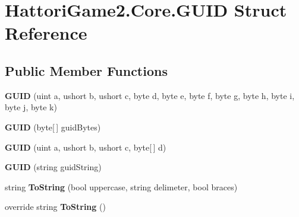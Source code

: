 \hypertarget{struct_hattori_game2_1_1_core_1_1_g_u_i_d}{}\section{Hattori\+Game2.\+Core.\+G\+U\+I\+D Struct Reference}
\label{struct_hattori_game2_1_1_core_1_1_g_u_i_d}
\subsection*{Public Member Functions}
\begin{DoxyCompactItemize}
\item 
\hypertarget{struct_hattori_game2_1_1_core_1_1_g_u_i_d_ac250910f8bd38c576c0dd72c3b17f222}{}{\bfseries G\+U\+I\+D} (uint a, ushort b, ushort c, byte d, byte e, byte f, byte g, byte h, byte i, byte j, byte k)\label{struct_hattori_game2_1_1_core_1_1_g_u_i_d_ac250910f8bd38c576c0dd72c3b17f222}

\item 
\hypertarget{struct_hattori_game2_1_1_core_1_1_g_u_i_d_a6087c44453390e435652fe96ff97bc6c}{}{\bfseries G\+U\+I\+D} (byte\mbox{[}$\,$\mbox{]} guid\+Bytes)\label{struct_hattori_game2_1_1_core_1_1_g_u_i_d_a6087c44453390e435652fe96ff97bc6c}

\item 
\hypertarget{struct_hattori_game2_1_1_core_1_1_g_u_i_d_a156f153ffc19feb9d66557fb80c1abc4}{}{\bfseries G\+U\+I\+D} (uint a, ushort b, ushort c, byte\mbox{[}$\,$\mbox{]} d)\label{struct_hattori_game2_1_1_core_1_1_g_u_i_d_a156f153ffc19feb9d66557fb80c1abc4}

\item 
\hypertarget{struct_hattori_game2_1_1_core_1_1_g_u_i_d_ab31543ee194d45a0fbca037b33946ee2}{}{\bfseries G\+U\+I\+D} (string guid\+String)\label{struct_hattori_game2_1_1_core_1_1_g_u_i_d_ab31543ee194d45a0fbca037b33946ee2}

\item 
\hypertarget{struct_hattori_game2_1_1_core_1_1_g_u_i_d_aa101ab837f6c525e27c779a913691a1e}{}string {\bfseries To\+String} (bool uppercase, string delimeter, bool braces)\label{struct_hattori_game2_1_1_core_1_1_g_u_i_d_aa101ab837f6c525e27c779a913691a1e}

\item 
\hypertarget{struct_hattori_game2_1_1_core_1_1_g_u_i_d_a0db72568cde891f882a5363abcb995a6}{}override string {\bfseries To\+String} ()\label{struct_hattori_game2_1_1_core_1_1_g_u_i_d_a0db72568cde891f882a5363abcb995a6}

\end{DoxyCompactItemize}
